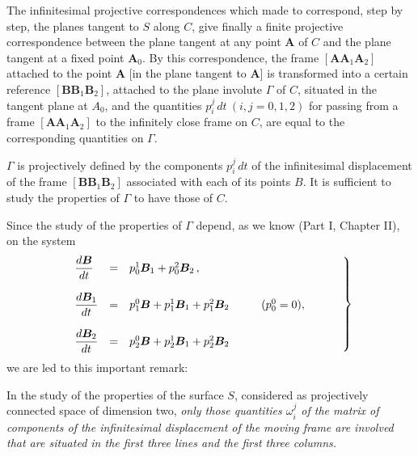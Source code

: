 The infinitesimal projective correspondences which made to correspond, step by step, the planes tangent to $S$ along $C$, give finally a finite projective correspondence between the plane tangent at any point $\bm A$ of $C$ and the plane tangent at a fixed point $\bm A_0$. By this correspondence, the frame $[\bm A \bm A_1 \bm A_2]$ attached to the point $\bm A$ [in the plane tangent to $\bm A$] is transformed into a certain reference $[\bm B \bm B_1 \bm B_2]$, attached to the plane involute $\Gamma$ of $C$, situated in the tangent plane at $A_0$, and the quantities $p^j_i\, dt\ (i,j=0,1,2)$ for passing from a frame $[\bm A \bm A_1 \bm A_2]$ to the infinitely close frame on $C$, are equal to the corresponding quantities on $\Gamma$.

$\Gamma$ is projectively defined by the components $p^j_i\, dt$  of the infinitesimal displacement of the frame $[\bm B \bm B_1 \bm B_2]$ associated with each of its points $B$. It is sufficient to study the properties of $\Gamma$ to have those of $C$.

Since the study of the properties of $\Gamma$  depend, as we know (Part I, Chapter II), on the system
\begin{eqnarray}
\left.
\begin{array}{lll}
\displaystyle \frac{d\bm B}{dt} &=& p^1_0 \bm B_1 + p^2_0 \bm B_2\, ,
\\ && \\
\displaystyle \frac{d\bm B_1}{dt} &=& p^0_1 \bm B + p^1_1 \bm B_1 + p^2_1 \bm B_2 \hspace*{1cm} (p^0_0 = 0),\hspace*{1cm}
\\ && \\
\displaystyle \frac{d\bm B_2}{dt} &=& p^0_2 \bm B + p^1_2 \bm B_1 + p^2_2 \bm B_2\, 
\end{array}
\right\}
\label{eq:1-2}
\end{eqnarray}
we are led to this important remark:

In the study of the properties of the surface $S$, considered as projectively connected space of dimension two, {\em only those quantities $\omega^j_i$ of the matrix of components of the infinitesimal displacement of the moving frame are involved that are situated in the first three lines and the first three columns.}


















































